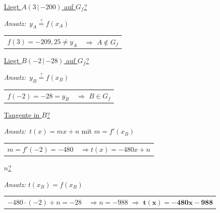 \documentclass[11pt,a4paper]{article}
\makeatletter
\newcommand{\teil}[2]{\par\filbreak\vspace{12pt}\noindent\makebox[1.6em][l]{\textbf{#1}}\underline{#2}\par\vspace{2pt}}
\newcommand{\sub}[1]{\par\vspace{8pt}\noindent\hspace{1.6em}\underline{#1}\par\vspace{2pt}}
\newcommand{\subsub}[1]{\par\vspace{5pt}\noindent\hspace{3.2em}\underline{#1}\par\vspace{2pt}}
\newcommand{\ansatz}[1]{\noindent\hspace{1.6em}\textit{Ansatz:}\ #1\par\vspace{3pt}}
\newenvironment{weg}{\par\noindent\hspace{3.2em}\renewcommand{\arraystretch}{1.45}\begin{tabular}{@{}l@{\quad}l@{}}}{\end{tabular}\par}
\newcommand{\B}[1]{\boldsymbol{#1}}
\newcommand{\trenn}{\par\vspace{8pt}{\color{grau!50}\hrule}}
\makeatother
\begin{document}
\teil{d)}{Liegt $A(3\,|\,{-200})$ auf $G_f$?}
\ansatz{$y_A\overset{?}{=}f(x_A)$}
\begin{weg}
$f(3)=-209{,}25\neq y_A$ & $\Rightarrow$ \textbf{$A\notin G_f$}\\
\end{weg}
\sub{Liegt $B(-2\,|\,{-28})$ auf $G_f$?}
\ansatz{$y_B\overset{?}{=}f(x_B)$}
\begin{weg}
$f(-2)=-28=y_B$ & $\Rightarrow$ \textbf{$B\in G_f$}\\
\end{weg}
\sub{Tangente in $B$?}
\ansatz{$t(x)=mx+n$ mit $m=f'(x_B)$}
\begin{weg}
$m=f'(-2)=-480$ & $\Rightarrow t(x)=-480x+n$\\
\end{weg}
\subsub{$n$?}
\par\noindent\hspace{3.2em}\textit{Ansatz:} $t(x_B)=f(x_B)$\par\vspace{3pt}
\begin{weg}
$-480\cdot(-2)+n=-28$ & $\Rightarrow n=-988$ $\Rightarrow$ $\B{t(x)=-480x-988}$\\
\end{weg}
\trenn
\end{document}
